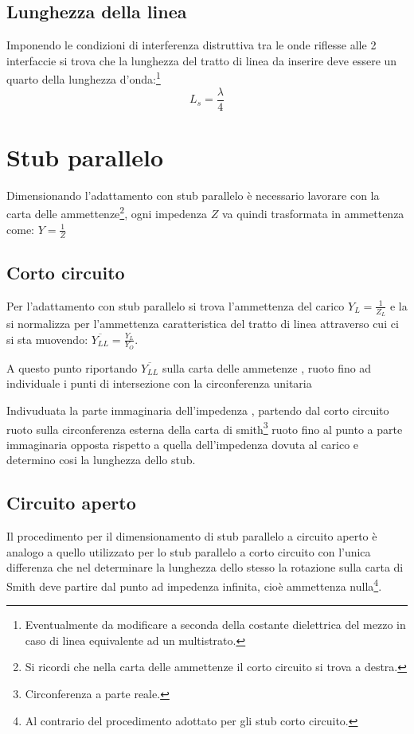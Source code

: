 \documentclass[10pt,a4paper]{report}
\begin{document}
		\subsection{Lunghezza della linea}
				Imponendo le condizioni di interferenza distruttiva tra le onde riflesse alle 2 interfaccie si trova che la lunghezza del tratto di linea da inserire deve essere un quarto della lunghezza d'onda:\footnote{Eventualmente da modificare a seconda della costante dielettrica del mezzo in caso di linea equivalente ad un multistrato.}
				\begin{equation}
				L_s= \frac {\lambda} {4}
				\end{equation}

	\section{Stub parallelo}

		Dimensionando l'adattamento con stub parallelo è necessario lavorare con la carta delle ammettenze\footnote{Si ricordi che nella carta delle ammettenze il corto circuito si trova a destra.}, ogni impedenza $Z$ va quindi trasformata in ammettenza come: $Y=\frac{1}{Z}$

		\subsection{Corto circuito}
				
			Per l'adattamento con stub parallelo si trova l'ammettenza del carico $Y_L=\frac{1}{Z_L}$ e la si normalizza per l'ammettenza caratteristica del tratto di linea attraverso cui ci si sta muovendo: $\overline{Y_{LL}}=\frac{Y_L}{Y_O}$.


			A questo punto riportando $\overline{Y_{LL}}$ sulla carta delle ammetenze , ruoto fino ad individuale i punti di intersezione con la circonferenza unitaria

			Indivuduata la parte immaginaria dell'impedenza , partendo dal corto circuito ruoto sulla circonferenza esterna della carta di smith\footnote{Circonferenza a parte reale.} ruoto fino al punto a parte immaginaria opposta rispetto a quella dell'impedenza dovuta al carico e determino cosi la lunghezza dello stub.

		\subsection{Circuito aperto}

		Il procedimento per il dimensionamento di stub parallelo a circuito aperto è analogo a quello utilizzato per lo stub parallelo a corto circuito con l'unica differenza che nel determinare la lunghezza dello stesso la rotazione sulla carta di Smith deve partire dal punto ad impedenza infinita, cioè ammettenza nulla\footnote{Al contrario del procedimento adottato per gli stub corto circuito.}.
\end{document}
